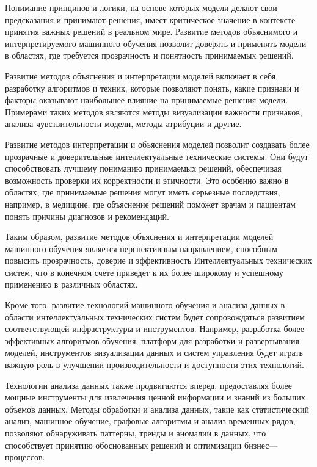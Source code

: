     Понимание принципов и логики, на основе которых модели делают свои предсказания и принимают решения, имеет критическое значение в контексте принятия важных решений в реальном мире. Развитие методов объяснимого и интерпретируемого машинного обучения позволит доверять и применять модели в областях, где требуется прозрачность и понятность принимаемых решений.
    
    Развитие методов объяснения и интерпретации моделей включает в себя разработку алгоритмов и техник, которые позволяют понять, какие признаки и факторы оказывают наибольшее влияние на принимаемые решения модели. Примерами таких методов являются методы визуализации важности признаков, анализа чувствительности модели, методы атрибуции и другие.
    
    Развитие методов интерпретации и объяснения моделей позволит создавать более прозрачные и доверительные интеллектуальные технические системы. Они будут способствовать лучшему пониманию принимаемых решений, обеспечивая возможность проверки их корректности и этичности. Это особенно важно в областях, где принимаемые решения могут иметь серьезные последствия, например, в медицине, где объяснение решений поможет врачам и пациентам понять причины диагнозов и рекомендаций.
    
    Таким образом, развитие методов объяснения и интерпретации моделей машинного обучения является перспективным направлением, способным повысить прозрачность, доверие и эффективность Интеллектуальных технических систем, что в конечном счете приведет к их более широкому и успешному применению в различных областях.
    
    Кроме того, развитие технологий машинного обучения и анализа данных в области интеллектуальных технических систем будет сопровождаться развитием соответствующей инфраструктуры и инструментов. Например, разработка более эффективных алгоритмов обучения, платформ для разработки и развертывания моделей, инструментов визуализации данных и систем управления будет играть важную роль в улучшении производительности и доступности этих технологий.
    
    Технологии анализа данных также продвигаются вперед, предоставляя более мощные инструменты для извлечения ценной информации и знаний из больших объемов данных. Методы обработки и анализа данных, такие как статистический анализ, машинное обучение, графовые алгоритмы и анализ временных рядов, позволяют обнаруживать паттерны, тренды и аномалии в данных, что способствует принятию обоснованных решений и оптимизации бизнес—процессов.
    
